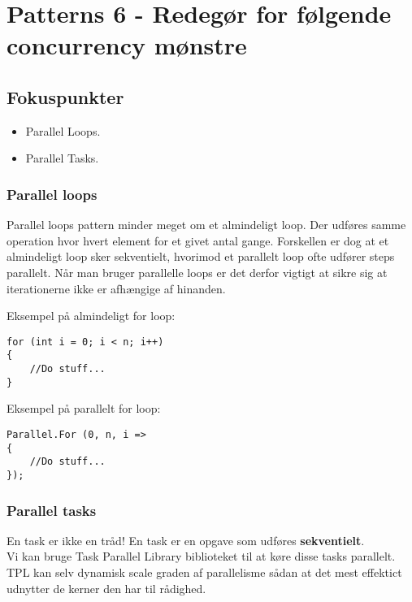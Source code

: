 \section{Patterns 6 - Redegør for følgende concurrency mønstre}

\subsection{Fokuspunkter}

\begin{itemize}
	\item Parallel Loops.
	\item Parallel Tasks.
\end{itemize}

\subsubsection{Parallel loops}

Parallel loops pattern minder meget om et almindeligt loop. Der udføres samme operation hvor hvert element for et givet antal gange. Forskellen er dog at et almindeligt loop sker sekventielt, hvorimod et parallelt loop ofte udfører steps parallelt. Når man bruger parallelle loops er det derfor vigtigt at sikre sig at iterationerne ikke er afhængige af hinanden.

Eksempel på almindeligt for loop:

\begin{lstlisting}[caption=Normal for loop, label=code:normalLoop]
for (int i = 0; i < n; i++)
{
	//Do stuff...
}
\end{lstlisting}

Eksempel på parallelt for loop:

\begin{lstlisting}[caption=Parallel for loop,  label=code:paraLoop,
morekeywords={Parallel, For}]
Parallel.For (0, n, i =>
{
	//Do stuff...
});
\end{lstlisting}

\subsubsection{Parallel tasks}

En task er ikke en tråd! En task er en opgave som udføres \textbf{sekventielt}.\\

Vi kan bruge Task Parallel Library biblioteket til at køre disse tasks parallelt. TPL kan selv dynamisk scale graden af parallelisme sådan at det mest effektict udnytter de kerner den har til rådighed.

